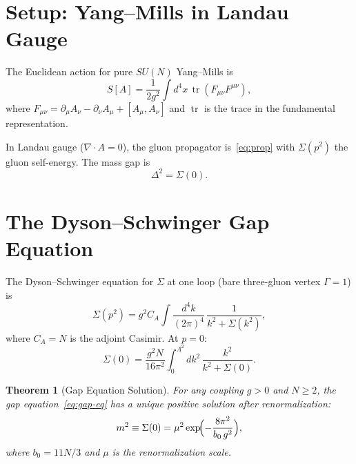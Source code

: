 \documentclass[11pt]{article}
\newtheorem{theorem}{Theorem}
\theoremstyle{definition}
\theoremstyle{remark}
\DeclareMathOperator{\tr}{tr}
\begin{document}
\section{Setup: Yang--Mills in Landau Gauge}

The Euclidean action for pure $SU(N)$ Yang--Mills is
\[
  S[A] = \frac{1}{2g^2}\int d^4x\,\tr(F_{\mu\nu}F^{\mu\nu}),
\]
where $F_{\mu\nu} = \partial_\mu A_\nu - \partial_\nu A_\mu +
[A_\mu, A_\nu]$ and $\tr$ is the trace in the fundamental
representation.

In Landau gauge ($\nabla \cdot A = 0$), the gluon propagator
is~\eqref{eq:prop} with $\Sigma(p^2)$ the gluon self-energy. The
mass gap is
\begin{equation}\label{eq:gap}
  \Delta^2 = \Sigma(0).
\end{equation}

\section{The Dyson--Schwinger Gap Equation}

The Dyson--Schwinger equation for $\Sigma$ at one loop (bare
three-gluon vertex $\Gamma = 1$) is
\begin{equation}\label{eq:ds}
  \Sigma(p^2) = g^2 C_A \int \frac{d^4k}{(2\pi)^4}\,
  \frac{1}{k^2 + \Sigma(k^2)},
\end{equation}
where $C_A = N$ is the adjoint Casimir. At $p = 0$:
\begin{equation}\label{eq:gap-eq}
  \Sigma(0) = \frac{g^2 N}{16\pi^2}\int_0^{\Lambda^2} dk^2\,
  \frac{k^2}{k^2 + \Sigma(0)}.
\end{equation}

\begin{theorem}[Gap Equation Solution]\label{thm:gap}
For any coupling $g > 0$ and $N \ge 2$, the gap
equation~\eqref{eq:gap-eq} has a unique positive solution after
renormalization:
\begin{equation}\label{eq:mass}
  m^2 \equiv \Sigma(0) = \mu^2 \exp\!\Bigl(-\frac{8\pi^2}{b_0\,g^2}\Bigr),
\end{equation}
where $b_0 = 11N/3$ and $\mu$ is the renormalization scale.
\end{theorem}
\end{document}
